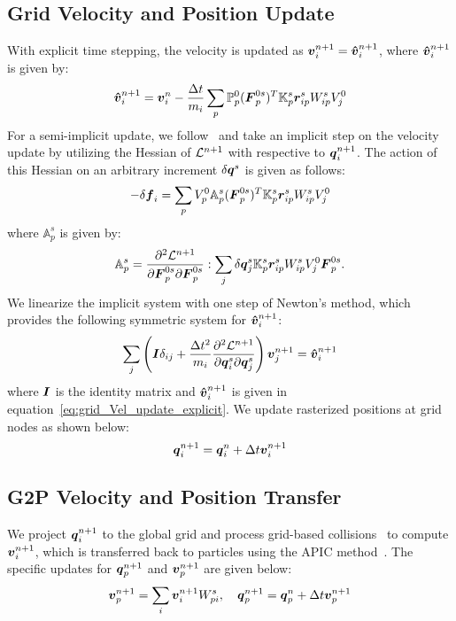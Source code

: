\subsection{Grid Velocity and Position Update}
With explicit time stepping, the velocity is updated as $\boldsymbol{v}_i^{n+1}=\boldsymbol{\hat{v}}_i^{n+1}$, where $\boldsymbol{\hat{v}}_i^{n+1}$ is given by: 
\begin{equation}
\boldsymbol{\hat{v}}_i^{n+1}=\boldsymbol{v}_i^n-\frac{\Delta t}{m_i}\sum_p\mathbb{P}_p^0(\boldsymbol{F}_p^{0s})^T\mathbb{K}_p^s\boldsymbol{r}_{ip}^s W_{ip}^s V_j^0\\
\label{eq:grid_Vel_update_explicit}
\end{equation}
For a semi-implicit update, we follow~\cite{Stomakhin:2013:MPMsnow, Hu:2018:Moving} and take an implicit step on the velocity update by utilizing the Hessian of $\mathcal{L}^{n+1}$ with respective to $\boldsymbol{q}_i^{n+1}$. 
The action of this Hessian on an arbitrary increment $\delta \boldsymbol{q}^s$ is given as follows:
 \begin{equation}
     -\delta \boldsymbol{f}_i=\sum_pV_p^0 \mathbb{A}_p^s(\boldsymbol{F}_p^{0s})^T\mathbb{K}_p^s\boldsymbol{r}_{ip}^s W_{ip}^s V_j^0
     \label{eq:Hessian_L_derivative}
 \end{equation}
 where $\mathbb{A}_p^s$ is given by: 
 \begin{equation}
     \mathbb{A}_p^s=\frac{\partial ^2 \mathcal{L}^{n+1}}{\partial \boldsymbol{F}_p^{0s} \partial\boldsymbol{F}_p^{0s}}:\sum_j\delta \boldsymbol{q}_j^s \mathbb{K}_p^s\boldsymbol{r}_{ip}^s W_{ip}^s V_j^0 \boldsymbol{F}_p^{0s}.
 \end{equation}
 We linearize the implicit system with one step of Newton's method, which provides the following symmetric system for $\boldsymbol{\hat{v}}_i^{n+1}$:
 \begin{equation}
 \sum_j\left(\boldsymbol{I}\delta_{ij}+\frac{\Delta t^2}{m_i}\frac{\partial ^2 \mathcal{L}^{n+1}}{\partial \boldsymbol{q}_i^s \partial\boldsymbol{q}_j^s}\right) \boldsymbol{v}_j^{n+1}=\boldsymbol{\hat{v}}_i^{n+1}
 \label{eq:grid_Vel_update_implicit}
 \end{equation}
 where $\boldsymbol{I}$ is the identity matrix and $\boldsymbol{\hat{v}}_i^{n+1}$ is given in equation~\eqref{eq:grid_Vel_update_explicit}. We update rasterized positions at grid nodes as shown below:
 \begin{equation}
  \boldsymbol{q}_i^{n+1}=\boldsymbol{q}_i^n+\Delta t\boldsymbol{{v}}_i^{n+1}
 \end{equation}

\subsection{G2P Velocity and Position Transfer} 
We project $\boldsymbol{q}_i^{n+1}$ to the global grid and process grid-based collisions~\cite{Stomakhin:2013:MPMsnow} to compute $\boldsymbol{v}_i^{n+1}$, which is transferred back to particles using the APIC method~\cite{jiang:2015:apic}. %
The specific updates for $\boldsymbol{q}_p^{n+1}$ and $\boldsymbol{v}_p^{n+1}$ are given below:
\begin{equation}
    \boldsymbol{v}_p^{n+1}=\sum_i\boldsymbol{v}_i^{n+1}W_{pi}^s,\quad \boldsymbol{q}_p^{n+1}=\boldsymbol{q}_p^n+\Delta t \boldsymbol{v}_p^{n+1}
\end{equation}
